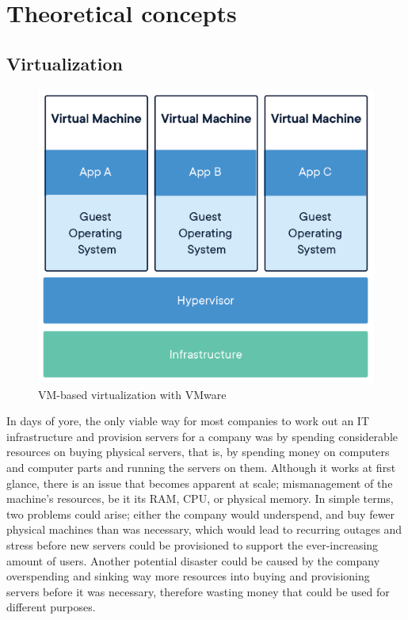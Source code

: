 \documentclass[thesis=B,english]{FITthesis}[2019/12/23]
\begin{document}
\clearpage

\section{Theoretical concepts}

\subsection{Virtualization}

\begin{figure}[H]
\centering
\caption{VM-based virtualization with VMware \cite{what-container}}
\hspace*{-0.4cm}
\includegraphics[scale=0.75]{virtualization}
\end{figure}

In days of yore, the only viable way for most companies to work out an IT infrastructure and provision servers for a company was by spending considerable resources on buying physical servers, that is, by spending money on computers and computer parts and running the servers on them. Although it works at first glance, there is an issue that becomes apparent at scale; mismanagement of the machine’s resources, be it its RAM, CPU, or physical memory. In simple terms, two problems could arise; either the company would underspend, and buy fewer physical machines than was necessary, which would lead to recurring outages and stress before new servers could be provisioned to support the ever-increasing amount of users. Another potential disaster could be caused by the company overspending and sinking way more resources into buying and provisioning servers before it was necessary, therefore wasting money that could be used for different purposes.
\end{document}
